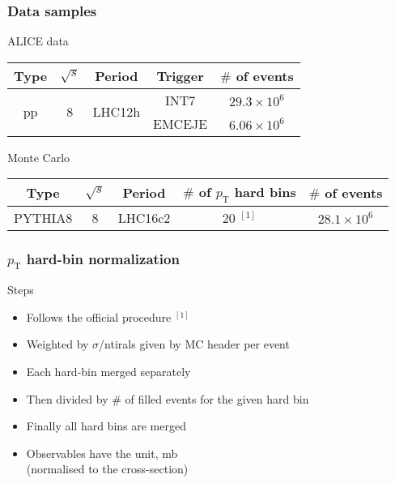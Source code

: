 \begin{frame}
\frametitle{Data samples}
ALICE data
\begin{table}[htp]
\begin{center}
\begin{tabular}{|c|c|c|c|c|}
\hline
Type & $\sqrt{s}$ & Period & Trigger & $\#$ of events\\
\hline
\multirow{ 2}{*}{pp} & \multirow{ 2}{*}{8} & \multirow{ 2}{*}{LHC12h} & INT7 & $29.3\times10^6$ \\
                    &                    &													& EMCEJE & $6.06\times10^6$ \\

\hline
\end{tabular}
\end{center}
\label{default}
\end{table}%

Monte Carlo
\begin{table}[htp]
\begin{center}
\begin{tabular}{|c|c|c|c|c|}
\hline
Type & $\sqrt{s}$ & Period & $\#$ of $p_\mathrm{T}$ hard bins & $\#$ of events\\
\hline
PYTHIA8 & 8 & LHC16c2 & 20 $^{[1]}$ & $28.1\times10^6$ \\
\hline
\end{tabular}
\end{center}
\label{default}
\end{table}%

\end{frame}


\begin{frame}
\frametitle{$p_\mathrm{T}$ hard-bin normalization}
Steps
\begin{itemize}
\item{Follows the official procedure $^{[1]}$}
\item{Weighted by $\sigma$/ntirals given by MC header per event}
\item{Each hard-bin merged separately}
\item{Then divided by $\#$ of filled events for the given hard bin}
\item{Finally all hard bins are merged}
\item{Observables have the unit, mb \\(normalised to the cross-section)}
\end{itemize}
\scriptsize
{}
\end{frame}

